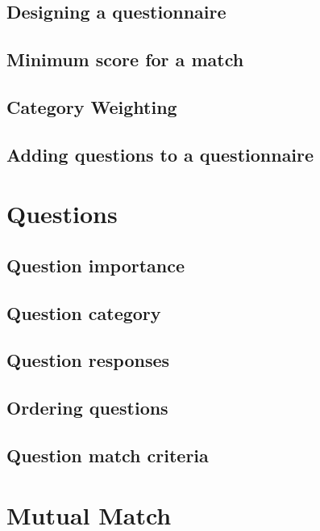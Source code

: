 \documentclass[a4paper,11pt,titlepage]{scrartcl}
\begin{document}
\subsection{Designing a questionnaire}

\subsection{Minimum score for a match}

\subsection{Category Weighting}

\subsection{Adding questions to a questionnaire}


\clearpage
\section{Questions}
\label{sec:questions}

\subsection{Question importance}
\label{sec:qimportance}

\subsection{Question category}
\label{sec:qcategory}

\subsection{Question responses}
\label{sec:qresponses}

\subsection{Ordering questions}
\label{sec:qordering}

\subsection{Question match criteria}
\label{sec:matchcriterua}

\clearpage
\section{Mutual Match}
\label{sec:matching}
\end{document}

